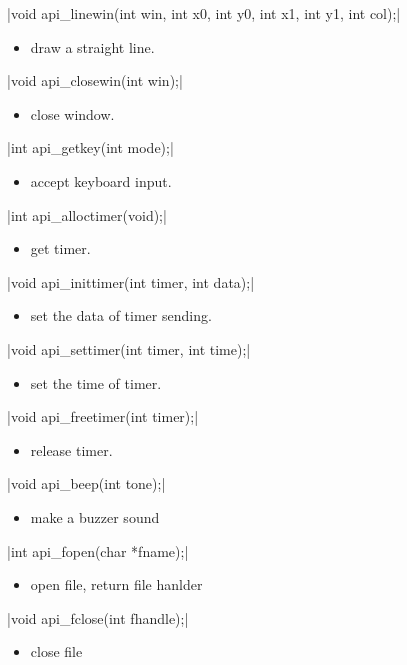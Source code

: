 \documentclass{swfcthesis}
\begin{document}
\csingle|void api_linewin(int win, int x0, int y0, int x1, int y1, int col);|
\begin{itemize}
\item draw a straight line.
\end{itemize}

\csingle|void api_closewin(int win);|
\begin{itemize}
\item close window.
\end{itemize}

\csingle|int api_getkey(int mode);|
\begin{itemize}
\item accept keyboard input.
\end{itemize}

\csingle|int api_alloctimer(void);|
\begin{itemize}
\item get timer.
\end{itemize}

\csingle|void api_inittimer(int timer, int data);|
\begin{itemize}
\item set the data of timer sending.
\end{itemize}

\csingle|void api_settimer(int timer, int time);|
\begin{itemize}
\item set the time of timer.
\end{itemize}

\csingle|void api_freetimer(int timer);|
\begin{itemize}
\item release timer.
\end{itemize}

\csingle|void api_beep(int tone);|
\begin{itemize}
\item make a buzzer sound
\end{itemize}

\csingle|int api_fopen(char *fname);|
\begin{itemize}
\item open file, return file hanlder
\end{itemize}

\csingle|void api_fclose(int fhandle);|
\begin{itemize}
\item close file
\end{itemize}
\end{document}
